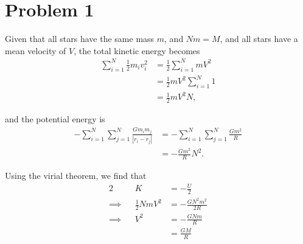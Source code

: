 \documentclass[11pt,letterpaper]{article}
\begin{document}
\section*{Problem 1}

Given that all stars have the same mass $m$, and $Nm=M$, and all stars have a mean velocity of $V$, the total kinetic energy becomes 
\begin{align*}
    \sum^N_{i=1}\frac{1}{2}m_iv_i^2 &= \frac{1}{2}\sum^N_{i=1}mV^2 \\
    &= \frac{1}{2}mV^2\sum^N_{i=1}1 \\
    &= \frac{1}{2}mV^2N,
\end{align*}

and the potential energy is
\begin{align*}
    -\sum^N_{i=1}\sum^N_{j=1}\frac{Gm_im_j}{|r_i-r_j|} &= -\sum^N_{i=1}\sum^N_{j=1}\frac{Gm^2}{R} \\
    &= -\frac{Gm^2}{R}N^2.
\end{align*}

Using the virial theorem, we find that 
\begin{alignat*}{2}
    &&K &= -\frac{U}{2} \\
    \implies&& \frac{1}{2}NmV^2 &= - \frac{GN^2m^2}{2R} \\
    \implies&& V^2 &= -\frac{GNm}{R} \\ 
    &&&=\frac{GM}{R}
\end{alignat*}
\end{document}
